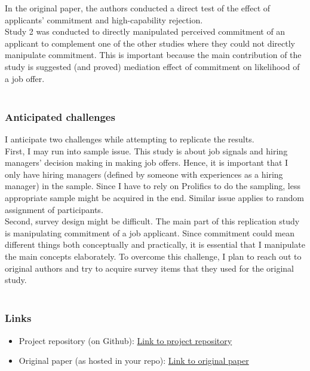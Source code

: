 \documentclass[]{article}
\providecommand{\tightlist}{%
  \setlength{\itemsep}{0pt}\setlength{\parskip}{0pt}}
\begin{document}
In the original paper, the authors conducted a direct test of the effect
of applicants' commitment and high-capability rejection.\\
Study 2 was conducted to directly manipulated perceived commitment of an
applicant to complement one of the other studies where they could not
directly manipulate commitment. This is important because the main
contribution of the study is suggested (and proved) mediation effect of
commitment on likelihood of a job offer.\\
~\\

\hypertarget{anticipated-challenges}{%
\subsubsection{Anticipated challenges}\label{anticipated-challenges}}

I anticipate two challenges while attempting to replicate the results.\\
First, I may run into sample issue. This study is about job signals and
hiring managers' decision making in making job offers. Hence, it is
important that I only have hiring managers (defined by someone with
experiences as a hiring manager) in the sample. Since I have to rely on
Prolifics to do the sampling, less appropriate sample might be acquired
in the end. Similar issue applies to random assignment of
participants.\\
Second, survey design might be difficult. The main part of this
replication study is manipulating commitment of a job applicant. Since
commitment could mean different things both conceptually and
practically, it is essential that I manipulate the main concepts
elaborately. To overcome this challenge, I plan to reach out to original
authors and try to acquire survey items that they used for the original
study.\\
~\\

\hypertarget{links}{%
\subsubsection{Links}\label{links}}

\begin{itemize}
\tightlist
\item
  Project repository (on Github):
  \href{https://github.com/psych251/galperin2020.git}{Link to project
  repository}
\item
  Original paper (as hosted in your repo):
  \href{https://github.com/psych251/galperin2020/blob/1176bad85fcced90757aa9a19be77c14f0b70a5f/original_paper/galperin_et_al_2020.pdf}{Link
  to original paper}
\end{itemize}
\end{document}
